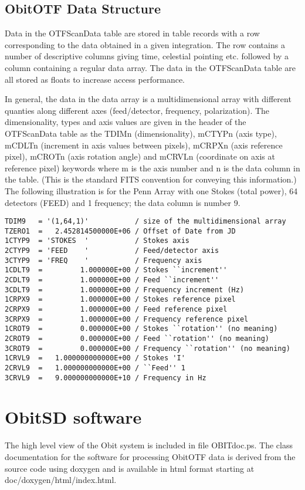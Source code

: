 \documentclass[11pt]{article}
\begin{document}
\subsection{ObitOTF Data Structure}
Data in the OTFScanData table are stored in table records with a row
corresponding to the data obtained in a given integration.
The row contains a number of descriptive columns giving time,
celestial pointing etc. followed by a column containing a regular data
array.
The data in the OTFScanData table are all stored as floats to increase
access performance.

In general, the data in the data array is a multidimensional array with
different quanties along different axes (feed/detector, frequency,
polarization). 
The dimensionality, types and axis values are given in the header of
the OTFScanData table as the TDIMn (dimensionality), mCTYPn (axis
type), mCDLTn (increment in axis values between pixels), mCRPXn (axis
reference pixel), mCROTn (axis rotation angle) and mCRVLn (coordinate
on axis at reference pixel) keywords where m is the axis number and n
is the data column in the table.
(This is the standard FITS convention for conveying this information.)
The following illustration is for the Penn Array with one Stokes
(total power), 64 detectors (FEED) and 1 frequency; the data column is
number 9.
\begin{verbatim}
TDIM9   = '(1,64,1)'           / size of the multidimensional array
TZERO1  =   2.452814500000E+06 / Offset of Date from JD
1CTYP9  = 'STOKES  '           / Stokes axis
2CTYP9  = 'FEED    '           / Feed/detector axis
3CTYP9  = 'FREQ    '           / Frequency axis
1CDLT9  =         1.000000E+00 / Stokes ``increment''
2CDLT9  =         1.000000E+00 / Feed ``increment''
3CDLT9  =         1.000000E+00 / Frequency increment (Hz)
1CRPX9  =         1.000000E+00 / Stokes reference pixel
2CRPX9  =         1.000000E+00 / Feed reference pixel
3CRPX9  =         1.000000E+00 / Frequency reference pixel
1CROT9  =         0.000000E+00 / Stokes ``rotation'' (no meaning)
2CROT9  =         0.000000E+00 / Feed ``rotation'' (no meaning)
3CROT9  =         0.000000E+00 / Frequency ``rotation'' (no meaning)
1CRVL9  =   1.000000000000E+00 / Stokes 'I'
2CRVL9  =   1.000000000000E+00 / ``Feed'' 1
3CRVL9  =   9.000000000000E+10 / Frequency in Hz
\end{verbatim}


\section{ObitSD software}
The high level view of the Obit system is included in file
OBITdoc.ps.
The class documentation for the software for processing ObitOTF data
is derived from the source code using doxygen and is available
in html format starting at doc/doxygen/html/index.html.
\end{document}
